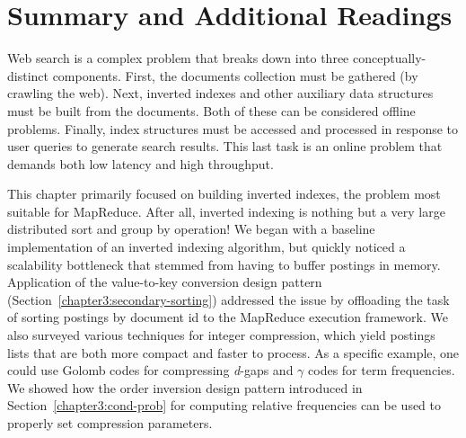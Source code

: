 \section{Summary and Additional Readings}
\label{chapter-indexing:summary}

Web search is a complex problem that breaks down into three
conceptually-distinct components.  First, the documents collection
must be gathered (by crawling the web).  Next, inverted indexes and
other auxiliary data structures must be built from the documents.
Both of these can be considered offline problems.  Finally, index
structures must be accessed and processed in response to user queries
to generate search results.  This last task is an online problem that
demands both low latency and high throughput.

This chapter primarily focused on building inverted indexes, the
problem most suitable for MapReduce.  After all, inverted indexing is
nothing but a very large distributed sort and group by operation!  We
began with a baseline implementation of an inverted indexing
algorithm, but quickly noticed a scalability bottleneck that stemmed
from having to buffer postings in memory.  Application of the
value-to-key conversion design pattern
(Section~\ref{chapter3:secondary-sorting}) addressed the issue by
offloading the task of sorting postings by document id to the
MapReduce execution framework.  We also surveyed various techniques
for integer compression, which yield postings lists that are both more
compact and faster to process.  As a specific example, one could use
Golomb codes for compressing \emph{d}-gaps and $\gamma$ codes for term
frequencies.  We showed how the order inversion design pattern
introduced in Section~\ref{chapter3:cond-prob} for computing relative
frequencies can be used to properly set compression parameters.

